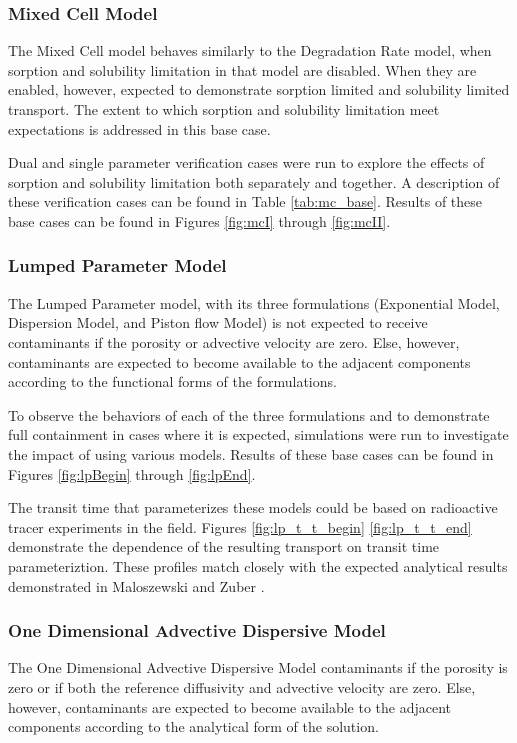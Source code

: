 \subsubsection{Mixed Cell Model}
The Mixed Cell model behaves similarly to the Degradation Rate 
model, when sorption and solubility limitation in that model are disabled. When they are 
enabled, however, expected to demonstrate sorption limited and solubility 
limited transport. The extent to which sorption and solubility limitation meet 
expectations is addressed in this base case.

Dual and single parameter verification cases were run to explore the effects of sorption and 
solubility limitation both separately and together. A description of these verification 
cases can be found in Table \ref{tab:mc_base}. 
Results of these base cases can be found in Figures \ref{fig:mcI} through 
\ref{fig:mcII}.


\FloatBarrier

\subsubsection{Lumped Parameter Model}
The Lumped Parameter model, with its three formulations (Exponential Model, 
Dispersion Model, and Piston flow Model) is not expected to receive 
contaminants if the porosity or advective velocity are zero. Else, however, 
contaminants are expected to  become available to the adjacent components 
according to the functional forms of the formulations. 

To observe the behaviors of each of the three formulations and to demonstrate 
full containment in cases where it is expected, simulations were run to 
investigate the impact of using various models. Results of these base cases can be found in Figures 
\ref{fig:lpBegin} through \ref{fig:lpEnd}.



The transit time that parameterizes these models could be based on radioactive 
tracer experiments in the field. Figures \ref{fig:lp_t_t_begin} 
\ref{fig:lp_t_t_end} demonstrate the dependence of the resulting transport on 
transit time parameteriztion. These profiles match closely with the expected 
analytical results demonstrated in Maloszewski and Zuber 
\cite{zuber_lumped_1985}.



\subsubsection{One Dimensional Advective Dispersive Model}
The One Dimensional Advective Dispersive Model contaminants if the porosity is 
zero or if both the reference diffusivity and advective velocity are zero. 
Else, however, contaminants are expected to  become available to the adjacent 
components according to the analytical form of the solution.

